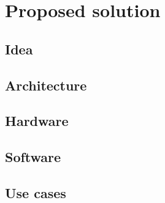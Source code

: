 
\chapter{Proposed solution}\label{chapter:proposed_solution}

	\section{Idea}

	\section{Architecture}
	
	\section{Hardware}
	
	\section{Software}
	
	\section{Use cases}